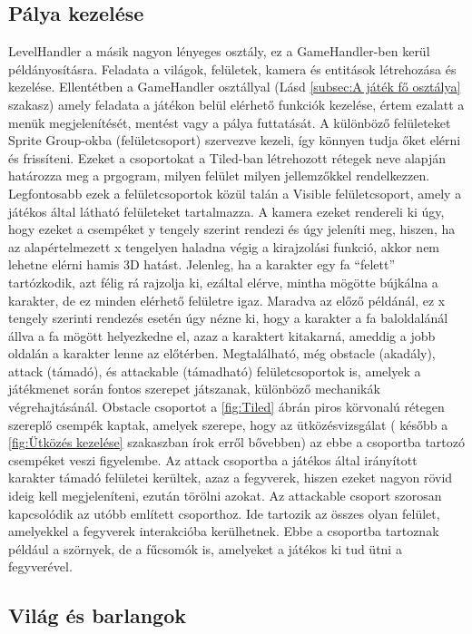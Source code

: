 \subsection{Pálya kezelése} \label{subsec:Pálya kezelése}
 LevelHandler a másik nagyon lényeges osztály, ez a GameHandler-ben kerül példányosításra. Feladata a világok, felületek, kamera és entitások létrehozása és kezelése. Ellentétben a GameHandler osztállyal (Lásd \ref{subsec:A játék fő osztálya} szakasz) amely feladata a játékon belül elérhető funkciók kezelése, értem ezalatt a menük megjelenítését, mentést vagy a pálya futtatását. 
A különböző felületeket Sprite Group-okba (felületcsoport) szervezve kezeli, így könnyen tudja őket elérni és frissíteni. Ezeket a csoportokat a Tiled-ban létrehozott rétegek neve alapján határozza meg a prgogram, milyen felület milyen jellemzőkkel rendelkezzen.
Legfontosabb ezek a felületcsoportok közül talán a Visible felületcsoport, amely a játékos által látható felületeket tartalmazza. A kamera ezeket rendereli ki úgy, hogy ezeket a csempéket y tengely szerint rendezi és úgy jeleníti meg, hiszen, ha az alapértelmezett x tengelyen haladna végig a kirajzolási funkció, akkor nem lehetne elérni hamis 3D hatást. Jelenleg, ha a karakter egy fa ``felett'' tartózkodik, azt félig rá rajzolja ki, ezáltal elérve, mintha mögötte bújkálna a karakter, de ez minden elérhető felületre igaz. Maradva az előző példánál, ez x tengely szerinti rendezés esetén úgy nézne ki, hogy a karakter a fa baloldalánál állva a fa mögött helyezkedne el, azaz a karaktert kitakarná, ameddig a jobb oldalán a karakter lenne az előtérben. 
Megtalálható, még obstacle (akadály), attack (támadó), és attackable (támadható) felületcsoportok is, amelyek a játékmenet során fontos szerepet játszanak, különböző mechanikák végrehajtásánál. Obstacle csoportot a \ref{fig:Tiled} ábrán piros körvonalú rétegen szereplő csempék kaptak, amelyek szerepe, hogy az ütközésvizsgálat ( később a \ref{fig:Ütközés kezelése} szakaszban írok erről bővebben) az ebbe a csoportba tartozó csempéket veszi figyelembe. Az attack csoportba a játékos által irányított karakter támadó felületei kerültek, azaz a fegyverek, hiszen ezeket nagyon rövid ideig kell megjeleníteni, ezután törölni azokat. Az attackable csoport szorosan kapcsolódik az utóbb említett csoporthoz. Ide tartozik az összes olyan felület, amelyekkel a fegyverek interakcióba kerülhetnek. Ebbe a csoportba tartoznak például a szörnyek, de a fűcsomók is, amelyeket a játékos ki tud ütni a fegyverével. 

\subsection{Világ és barlangok} \label{subsec:Világ és barlangok}

